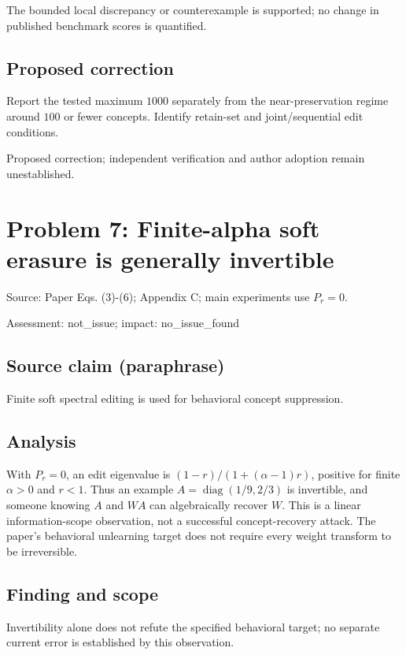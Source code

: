 \documentclass[11pt]{article}
\begin{document}
The bounded local discrepancy or counterexample is supported; no change in published benchmark scores is quantified.

\subsection*{Proposed correction}

Report the tested maximum \(1000\) separately from the near-preservation regime around \(100\) or fewer concepts. Identify retain-set and joint/sequential edit conditions.

Proposed correction; independent verification and author adoption remain unestablished.

\section*{Problem 7: Finite-alpha soft erasure is generally invertible}

Source: Paper Eqs. (3)-(6); Appendix C; main experiments use \(P_r=0\).

Assessment: not\_issue; impact: no\_issue\_found

\subsection*{Source claim (paraphrase)}

Finite soft spectral editing is used for behavioral concept suppression.

\subsection*{Analysis}

With \(P_r=0\), an edit eigenvalue is \((1-r)/(1+(\alpha-1)r)\), positive for finite \(\alpha>0\) and \(r<1\). Thus an example \(A=\operatorname{diag}(1/9,2/3)\) is invertible, and someone knowing \(A\) and \(WA\) can algebraically recover \(W\). This is a linear information-scope observation, not a successful concept-recovery attack. The paper’s behavioral unlearning target does not require every weight transform to be irreversible.

\subsection*{Finding and scope}

Invertibility alone does not refute the specified behavioral target; no separate current error is established by this observation.
\end{document}
